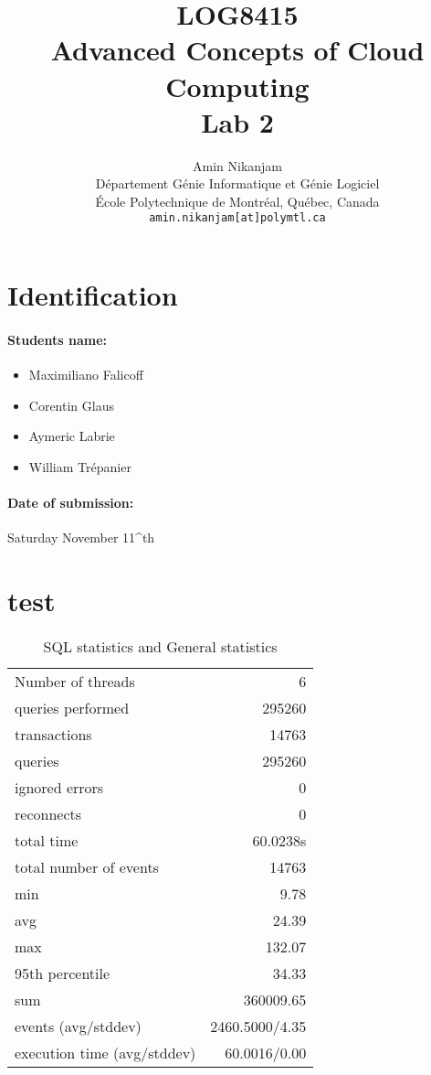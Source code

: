 \documentclass[11pt]{article}
\title{LOG8415\\Advanced Concepts of Cloud Computing\\Lab 2}
\author{
    Amin Nikanjam \\
    D\'{e}partement G\'{e}nie Informatique et G\'{e}nie Logiciel \\
    \'{E}cole Polytechnique de Montr\'{e}al, Qu\'{e}bec, Canada \\
    \texttt{amin.nikanjam[at]polymtl.ca} \\
}
\date{}
\def\auteur{}
\begin{document}
\maketitle

\section{Identification}

\paragraph{Students name:} 
\begin{itemize}
	\item Maximiliano Falicoff
	\item Corentin Glaus
	\item Aymeric Labrie
	\item William Trépanier

\end{itemize}
\auteur

\paragraph{Date of submission:} Saturday November 11^{th} 

\section{test}

\begin{table}[h!]
\centering
\begin{tabular}{ l r }
\hline
Number of threads & 6 \\
queries performed & 295260 \\
transactions & 14763 \\
queries & 295260 \\
ignored errors & 0 \\
reconnects & 0 \\
total time & 60.0238s \\
total number of events & 14763 \\
min & 9.78 \\
avg & 24.39 \\
max & 132.07 \\
95th percentile & 34.33 \\
sum & 360009.65 \\
events (avg/stddev) & 2460.5000/4.35 \\
execution time (avg/stddev) & 60.0016/0.00 \\
\hline
\end{tabular}
\caption{SQL statistics and General statistics}
\label{tab:table1}
\end{table}
\end{document}

